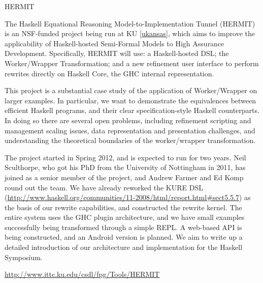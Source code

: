 \begin{hcarentry}[updated]{HERMIT}
\label{HERMIT}
\makeheader

The Haskell Equational Reasoning Model-to-Implementation Tunnel
(HERMIT) is an NSF-funded project being run at KU \cref{ukansas}, which aims to improve the
applicability of Haskell-hosted Semi-Formal Models to High Assurance Development.
Specifically, HERMIT will use: a Haskell-hosted DSL; the Worker/Wrapper Transformation;
and a new refinement user interface to perform rewrites directly on Haskell Core, the GHC internal representation.

This project is a substantial case study of the application of
Worker/Wrapper on larger examples. In particular, we want to
demonstrate the equivalences between efficient Haskell programs, and
their clear specification-style Haskell counterparts. In doing so
there are several open problems, including refinement scripting and
management scaling issues, data representation and presentation
challenges, and understanding the theoretical boundaries of the
worker/wrapper transformation.

The project started in Spring 2012, and is expected to run for two years.
Neil Sculthorpe, who got his PhD from the University of Nottingham in 2011, has joined as a senior member of the project,
and Andrew Farmer and Ed Komp round out the team.
We have already reworked the KURE DSL (\url{http://www.haskell.org/communities/11-2008/html/report.html#sect5.5.7}) as the basis of our rewrite capabilities, and constructed the rewrite kernel.
The entire system uses the GHC plugin architecture,
and we have small examples successfully being transformed through a simple REPL.
A web-based API is being constructed, and an Android version is planned.
We aim to write up a detailed introduction of our architecture
and implementation for the Haskell Symposium.

\FurtherReading
  \url{http://www.ittc.ku.edu/csdl/fpg/Tools/HERMIT}
\end{hcarentry}
